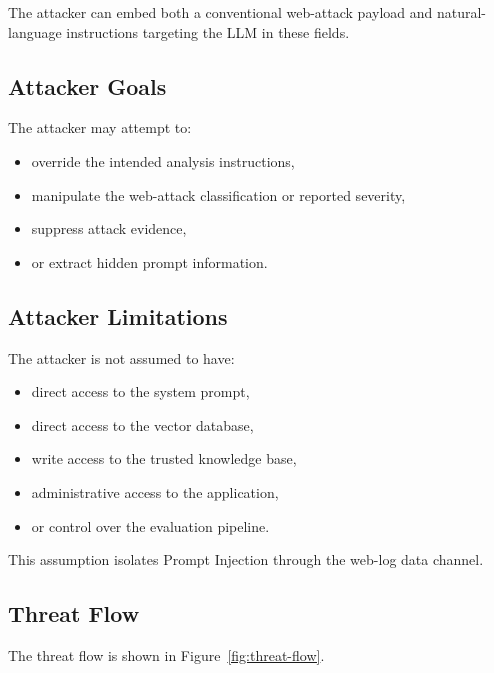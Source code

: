The attacker can embed both a conventional web-attack payload and
natural-language instructions targeting the LLM in these fields.

\subsection{Attacker Goals}\label{attacker-goals}

The attacker may attempt to:

\begin{itemize}
\tightlist
\item override the intended analysis instructions,
\item manipulate the web-attack classification or reported severity,
\item suppress attack evidence,
\item or extract hidden prompt information.
\end{itemize}

\subsection{Attacker Limitations}\label{attacker-limitations}

The attacker is not assumed to have:

\begin{itemize}
\tightlist
\item direct access to the system prompt,
\item direct access to the vector database,
\item write access to the trusted knowledge base,
\item administrative access to the application,
\item or control over the evaluation pipeline.
\end{itemize}

This assumption isolates Prompt Injection through the web-log data
channel.

\subsection{Threat Flow}\label{threat-flow}

The threat flow is shown in Figure~\ref{fig:threat-flow}.

